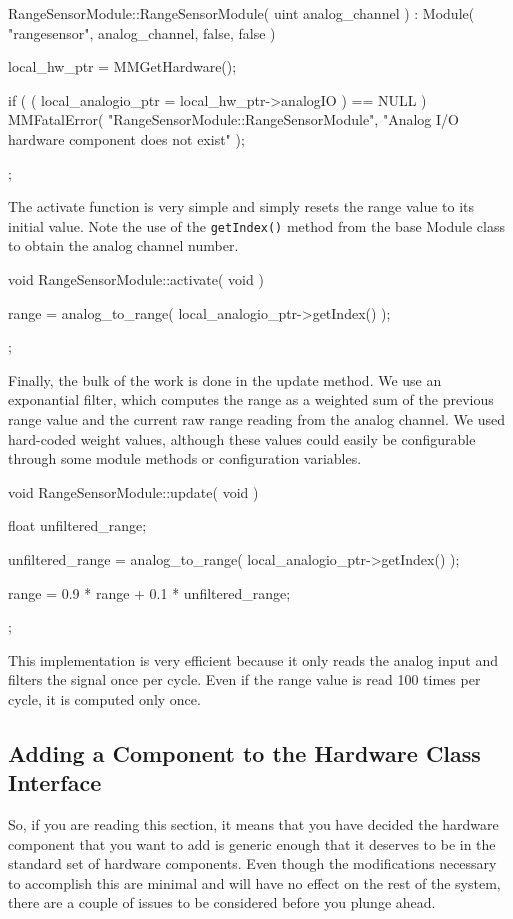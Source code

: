 \begin{codesegment}
RangeSensorModule::RangeSensorModule( uint analog_channel )
  : Module( "rangesensor", analog_channel, false, false ) {

  local_hw_ptr = MMGetHardware();

  if ( ( local_analogio_ptr = local_hw_ptr->analogIO ) == NULL )
    MMFatalError( "RangeSensorModule::RangeSensorModule",
                  "Analog I/O hardware component does not exist" );
};
\end{codesegment}

The activate function is very simple and simply resets the range value to
its initial value. Note the use of the {\tt getIndex()} method from the base
Module class to obtain the analog channel number.

\begin{codesegment}
void RangeSensorModule::activate( void ) {

  range = analog_to_range( local_analogio_ptr->getIndex() );
};
\end{codesegment}

Finally, the bulk of the work is done in the update method. We use an
exponantial filter, which computes the range as a weighted sum of the
previous range value and the current raw range reading from the analog
channel. We used hard-coded weight values, although these values could
easily be configurable through some module methods or configuration
variables.

\begin{codesegment}
void RangeSensorModule::update( void ) {

  float unfiltered_range;

  unfiltered_range = analog_to_range( local_analogio_ptr->getIndex() );

  range = 0.9 * range + 0.1 * unfiltered_range;
};
\end{codesegment}

This implementation is very efficient because it only reads the analog input
and filters the signal once per cycle. Even if the range value is read 100
times per cycle, it is computed only once.

\subsection{Adding a Component to the Hardware Class Interface}
\label{sec:adding_hardware}

So, if you are reading this section, it means that you have decided the
hardware component that you want to add is generic enough that it deserves
to be in the standard set of hardware components. Even though the
modifications necessary to accomplish this are minimal and will have no
effect on the rest of the system, there are a couple of issues to be
considered before you plunge ahead.

